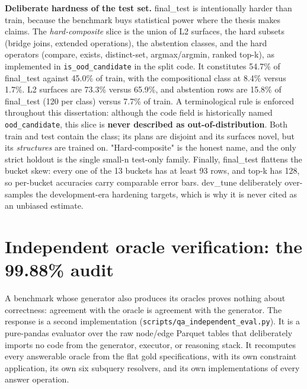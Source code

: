 \textbf{Deliberate hardness of the test set.} final\_test is intentionally harder than train, because the benchmark buys statistical power where the thesis makes claims. The \emph{hard-composite} slice is the union of L2 surfaces, the hard subsets (bridge joins, extended operations), the abstention classes, and the hard operators (compare, exists, distinct-set, argmax/argmin, ranked top-k), as implemented in \texttt{is\_ood\_candidate} in the split code. It constitutes 54.7\% of final\_test against 45.0\% of train, with the compositional class at 8.4\% versus 1.7\%. L2 surfaces are 73.3\% versus 65.9\%, and abstention rows are 15.8\% of final\_test (120 per class) versus 7.7\% of train. A terminological rule is enforced throughout this dissertation: although the code field is historically named \texttt{ood\_candidate}, this slice is \textbf{never described as out-of-distribution}. Both train and test contain the class; its plans are disjoint and its surfaces novel, but its \emph{structures} are trained on. "Hard-composite" is the honest name, and the only strict holdout is the single small-n test-only family. Finally, final\_test flattens the bucket skew: every one of the 13 buckets has at least 93 rows, and top-k has 128, so per-bucket accuracies carry comparable error bars. dev\_tune deliberately over-samples the development-era hardening targets, which is why it is never cited as an unbiased estimate.

\section{Independent oracle verification: the 99.88\% audit}\label{sec:independent-oracle-verification-the-99-8}

A benchmark whose generator also produces its oracles proves nothing about correctness: agreement with the oracle is agreement with the generator. The response is a second implementation (\texttt{scripts/qa\_independent\_eval.py}). It is a pure-pandas evaluator over the raw node/edge Parquet tables that deliberately imports no code from the generator, executor, or reasoning stack. It recomputes every answerable oracle from the flat gold specifications, with its own constraint application, its own six subquery resolvers, and its own implementations of every answer operation.

